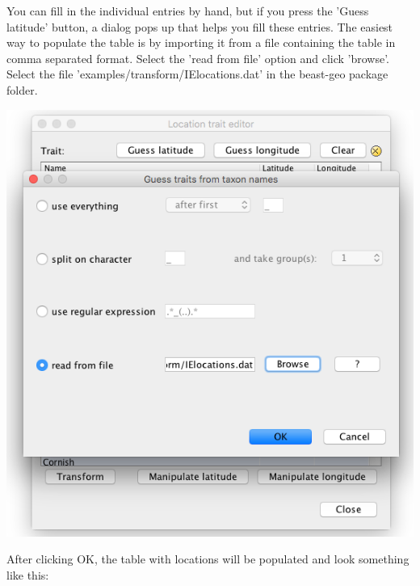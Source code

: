 \documentclass{article}
\begin{document}
You can fill in the individual entries by hand, but if you press the 'Guess latitude' button, a dialog pops up that helps you fill these entries.
The easiest way to populate the table is by importing it from a file containing the table in comma separated format. Select the 'read from file' option and click 'browse'. Select the file 'examples/transform/IElocations.dat' in the beast-geo package folder.

\begin{center}
\includegraphics[scale=0.4]{figures/BEAUti_transform3}
\end{center}

After clicking OK, the table with locations will be populated and look something like this:
\end{document}

